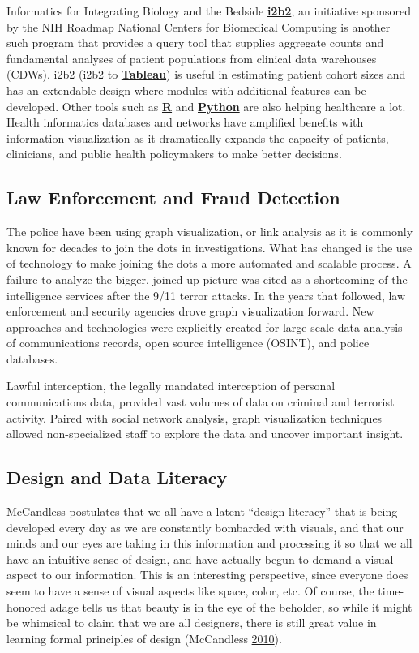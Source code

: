 \documentclass[]{book}
\begin{document}
Informatics for Integrating Biology and the Bedside
\href{https://www.i2b2.org}{\textbf{i2b2}}, an initiative sponsored by
the NIH Roadmap National Centers for Biomedical Computing is another
such program that provides a query tool that supplies aggregate counts
and fundamental analyses of patient populations from clinical data
warehouses (CDWs). i2b2 (i2b2 to
\href{https://www.tableau.com}{\textbf{Tableau}}) is useful in
estimating patient cohort sizes and has an extendable design where
modules with additional features can be developed. Other tools such as
\href{https://www.r-project.org}{\textbf{R}} and
\href{https://www.python.org}{\textbf{Python}} are also helping
healthcare a lot. Health informatics databases and networks have
amplified benefits with information visualization as it dramatically
expands the capacity of patients, clinicians, and public health
policymakers to make better decisions.

\subsection{Law Enforcement and Fraud
Detection}\label{law-enforcement-and-fraud-detection}

The police have been using graph visualization, or link analysis as it
is commonly known for decades to join the dots in investigations. What
has changed is the use of technology to make joining the dots a more
automated and scalable process. A failure to analyze the bigger,
joined-up picture was cited as a shortcoming of the intelligence
services after the 9/11 terror attacks. In the years that followed, law
enforcement and security agencies drove graph visualization forward. New
approaches and technologies were explicitly created for large-scale data
analysis of communications records, open source intelligence (OSINT),
and police databases.

Lawful interception, the legally mandated interception of personal
communications data, provided vast volumes of data on criminal and
terrorist activity. Paired with social network analysis, graph
visualization techniques allowed non-specialized staff to explore the
data and uncover important insight.

\subsection{Design and Data Literacy}\label{design-and-data-literacy}

McCandless postulates that we all have a latent ``design literacy'' that
is being developed every day as we are constantly bombarded with
visuals, and that our minds and our eyes are taking in this information
and processing it so that we all have an intuitive sense of design, and
have actually begun to demand a visual aspect to our information. This
is an interesting perspective, since everyone does seem to have a sense
of visual aspects like space, color, etc. Of course, the time-honored
adage tells us that beauty is in the eye of the beholder, so while it
might be whimsical to claim that we are all designers, there is still
great value in learning formal principles of design (McCandless
\protect\hyperlink{ref-viz_ted}{2010}).
\end{document}

